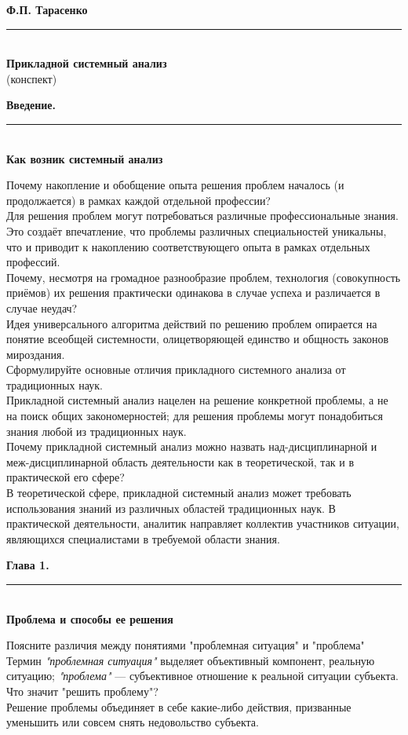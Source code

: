 \documentclass{article}
\newcommand{\note}[1]{\textit{#1}}
\renewcommand{\section}[2]{
	\vspace{5em}
	\begin{flushright}
	\Large
	\baselineskip=0.5\baselineskip
	\textbf{#1}
	\\
	\rule[0.5\baselineskip]{\textwidth}{0.15pt}
	\\
	\textbf{#2}
	\end{flushright}
	}
\renewcommand{\title}[2]{
	\begin{center}
		\LARGE
		\baselineskip=0.5\baselineskip
		\textbf{#1}
		\\
		\rule[0.5\baselineskip]{0.7\textwidth}{0.15pt}
		\\
		\textbf{#2}
		\\\baselineskip=2\baselineskip(конспект)		
	\end{center}
	}
\begin{document}
\title{Ф.П. Тарасенко}{Прикладной системный анализ}
\section{Введение.}{Как возник системный анализ}
Почему накопление и обобщение опыта решения проблем началось (и продолжается) в рамках каждой отдельной профессии?
\\
Для решения проблем могут потребоваться различные профессиональные знания. Это создаёт впечатление, что проблемы различных специальностей уникальны, что и приводит к накоплению соответствующего опыта в рамках отдельных профессий.
\\
Почему, несмотря на громадное разнообразие проблем, технология (совокупность приёмов) их решения практически одинакова в случае успеха и различается в случае неудач?
\\
Идея универсального алгоритма действий по решению проблем опирается на понятие всеобщей системности, олицетворяющей единство и общность законов мироздания.
\\
Сформулируйте основные отличия прикладного системного анализа от традиционных наук.
\\
Прикладной системный анализ нацелен на решение конкретной проблемы, а не на поиск общих закономерностей; для решения проблемы могут понадобиться знания любой из традиционных наук.
\\
Почему прикладной системный анализ можно назвать над-дисциплинарной и меж-дисциплинарной область деятельности как в теоретической, так и в практической его сфере?
\\
В теоретической сфере, прикладной системный анализ может требовать использования знаний из различных областей традиционных наук. В практической деятельности, аналитик направляет коллектив участников ситуации, являющихся специалистами в требуемой области знания.
\section{Глава 1.}{Проблема и способы ее решения}
Поясните различия между понятиями "проблемная ситуация" и "проблема"
\\
Термин \note{"проблемная ситуация"} выделяет объективный компонент, реальную ситуацию; \note{"проблема"} --- субъективное отношение к реальной ситуации субъекта.
\\
Что значит "решить проблему"?
\\
Решение проблемы объединяет в себе какие-либо действия, призванные уменьшить или совсем снять недовольство субъекта.
\end{document}
